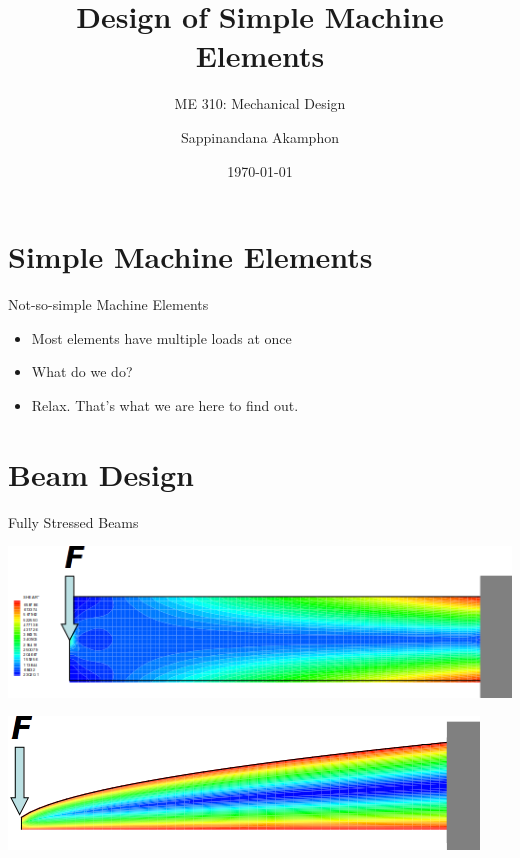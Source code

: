 \documentclass[10pt, svgnames]{beamer}
\author{Sappinandana Akamphon}
\date{\today}
\title{Design of Simple Machine Elements}
\subtitle{ME 310: Mechanical Design}
\institute{Department of Mechanical Engineering, TSE}
\date{}
\begin{document}
\maketitle

\section{Simple Machine Elements}
\label{sec:org8792df8}

\begin{frame}[label={sec:orge8616ee}]{Not-so-simple Machine Elements}
\begin{itemize}
\item Most elements have multiple loads at once
\item What do we do?
\item Relax. That's what we are here to find out.
\end{itemize}
\end{frame}

\section{Beam Design}
\label{sec:orge45c08c}

\begin{frame}[label={sec:org2a5e1ca}]{Fully Stressed Beams}
\begin{center}
\includegraphics[width=.9\linewidth]{./pictures/fea-beam.png}
\end{center}

\begin{center}
\includegraphics[width=.9\linewidth]{./pictures/fea-fully-stressed-beam.png}
\end{center}
\end{frame}
\end{document}
